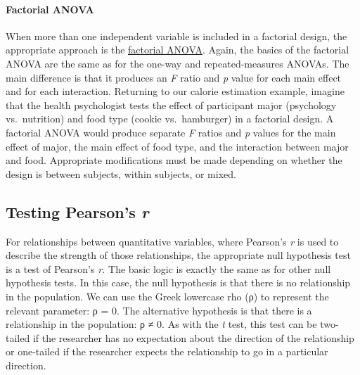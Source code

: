 \documentclass[
]{krantz}
\begin{document}
\hypertarget{factorial-anova}{%
\paragraph*{Factorial ANOVA}\label{factorial-anova}}

When more than one independent variable is included in a factorial design, the appropriate approach is the \protect\hyperlink{factorial-anova-1}{factorial ANOVA}. Again, the basics of the factorial ANOVA are the same as for the one-way and repeated-measures ANOVAs. The main difference is that it produces an \emph{F} ratio and \emph{p} value for each main effect and for each interaction. Returning to our calorie estimation example, imagine that the health psychologist tests the effect of participant major (psychology vs.~nutrition) and food type (cookie vs.~hamburger) in a factorial design. A factorial ANOVA would produce separate \emph{F} ratios and \emph{p} values for the main effect of major, the main effect of food type, and the interaction between major and food. Appropriate modifications must be made depending on whether the design is between subjects, within subjects, or mixed.

\hypertarget{testing-pearsons-r}{%
\subsection*{\texorpdfstring{Testing Pearson's \emph{r}}{Testing Pearson's r}}\label{testing-pearsons-r}}


For relationships between quantitative variables, where Pearson's \emph{r} is used to describe the strength of those relationships, the appropriate null hypothesis test is a test of Pearson's \emph{r.} The basic logic is exactly the same as for other null hypothesis tests. In this case, the null hypothesis is that there is no relationship in the population. We can use the Greek lowercase rho (ρ) to represent the relevant parameter: ρ = 0. The alternative hypothesis is that there is a relationship in the population: ρ ≠ 0. As with the \emph{t} test, this test can be two-tailed if the researcher has no expectation about the direction of the relationship or one-tailed if the researcher expects the relationship to go in a particular direction.
\end{document}
